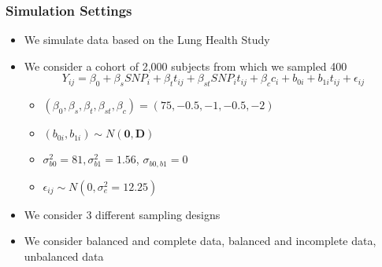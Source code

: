 \documentclass[pdf]{beamer}
\begin{document}
\begin{frame}
\frametitle{Simulation Settings}
\begin{itemize}
	\item We simulate data based on the Lung Health Study
	\item We consider a cohort of 2,000 subjects from which we sampled 400
	\begin{equation}\nonumber
	Y_{ij} = \beta_0 + \beta_s SNP_i + \beta_t t_{ij} + \beta_{st}SNP_it_{ij} + \beta_c c_{i} + b_{0i} + b_{1i}t_{ij} + \epsilon_{ij}
	\end{equation}
	\begin{itemize}
		\setlength\itemsep{0.5em}
		\item $(\beta_0, \beta_s, \beta_t, \beta_{st}, \beta_{c}) = (75, -0.5, -1, -0.5, -2)$
		\item $(b_{0i}, b_{1i}) \sim N(\boldsymbol{0}, \boldsymbol{D})$ 
		\item $\sigma^2_{b0} = 81, \sigma^2_{b1} = 1.56$, $\sigma_{b0, b1} = 0$
		\item $\epsilon_{ij} \sim N(0, \sigma_e^2 = 12.25)$
	\end{itemize}
	\item We consider 3 different sampling designs
	\item We consider balanced and complete data, balanced and incomplete data, unbalanced data
\end{itemize}
\end{frame}
\end{document}
